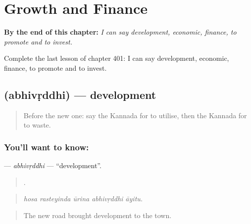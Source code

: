 
\chapter{Growth and Finance}
\label{ch:ka-growth-and-finance}

\begin{chapteropening}
\textbf{By the end of this chapter:} \emph{I can say development, economic, finance, to promote and to invest.}

Complete the last lesson of chapter 401: I can say development, economic, finance, to promote and to invest.
\end{chapteropening}

\section[\texorpdfstring{\kn{ಅಭಿವೃದ್ಧಿ} (abhivṛddhi)}{ಅಭಿವೃದ್ಧಿ (abhivṛddhi)}]{ (abhivṛddhi) — development}

\label{lesson:KA-C401-abhivrddhi}



\begin{quote}
Before the new one: say the Kannada for to utilise, then the Kannada for to waste.
\end{quote}

\subsection*{You'll want to know: }
\textbf{} — \emph{abhivṛddhi} — \textquotedblleft{}development\textquotedblright{}.

\begin{quote}
    .
\end{quote}

\begin{quote}
\emph{hosa rasteyinda ūrina abhivṛddhi āyitu.}
\end{quote}

\begin{quote}
The new road brought development to the town.
\end{quote}


